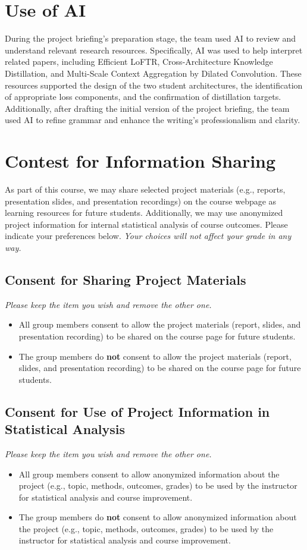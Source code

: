 \documentclass{article}
\begin{document}
\section*{Use of AI}
During the project briefing's preparation stage, the team used AI to review and understand relevant research resources. Specifically, AI was used to help interpret related papers, including Efficient LoFTR, Cross-Architecture Knowledge Distillation, and Multi-Scale Context Aggregation by Dilated Convolution. These resources supported the design of the two student architectures, the identification of appropriate loss components, and the confirmation of distillation targets. Additionally, after drafting the initial version of the project briefing, the team used AI to refine grammar and enhance the writing's professionalism and clarity.

\section*{Contest for Information Sharing}
As part of this course, we may share selected project materials (e.g., reports, presentation slides, and presentation recordings) on the course webpage as learning resources for future students. Additionally, we may use anonymized project information for internal statistical analysis of course outcomes. Please indicate your preferences below. \textit{Your choices will not affect your grade in any way.}

\subsection*{Consent for Sharing Project Materials}
\textit{Please keep the item you wish and remove the other one.}

\begin{itemize}
	\item All group members consent to allow the project materials (report, slides, and presentation recording) to be shared on the course page for future students.
	\item The group members do \textbf{not} consent to allow the project materials (report, slides, and presentation recording) to be shared on the course page for future students.
\end{itemize}



\subsection*{Consent for Use of Project Information in Statistical Analysis}
\textit{Please keep the item you wish and remove the other one.}
\begin{itemize}
	\item All group members consent to allow anonymized information about the project (e.g., topic, methods, outcomes, grades) to be used by the instructor for statistical analysis and course improvement.
	\item The group members do \textbf{not} consent to allow anonymized information about the project (e.g., topic, methods, outcomes, grades) to be used by the instructor for statistical analysis and course improvement.
\end{itemize}
\end{document}
